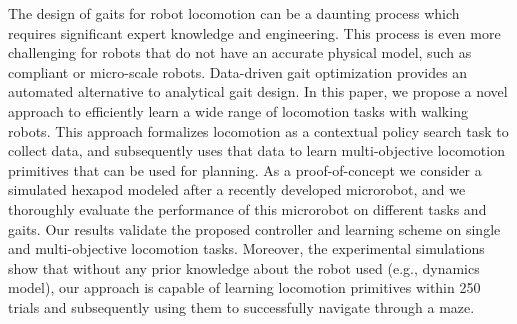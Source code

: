 The design of gaits for robot locomotion can be a daunting process which requires significant expert knowledge and engineering.
This process is even more challenging for robots that do not have an accurate physical model, such as compliant or micro-scale robots.
Data-driven gait optimization provides an automated alternative to analytical gait design.
In this paper, we propose a novel approach to efficiently learn a wide range of locomotion tasks with walking robots.
This approach formalizes locomotion as a contextual policy search task to collect data, and subsequently uses that data to learn multi-objective locomotion primitives that can be used for planning.
As a proof-of-concept we consider a simulated hexapod modeled after a recently developed microrobot, and we thoroughly evaluate the performance of this microrobot on different tasks and gaits.
Our results validate the proposed controller and learning scheme on single and multi-objective locomotion tasks.
Moreover, the experimental simulations show that without any prior knowledge about the robot used (e.g., dynamics model), our approach is capable of learning locomotion primitives within 250 trials and subsequently using them to successfully navigate through a maze.